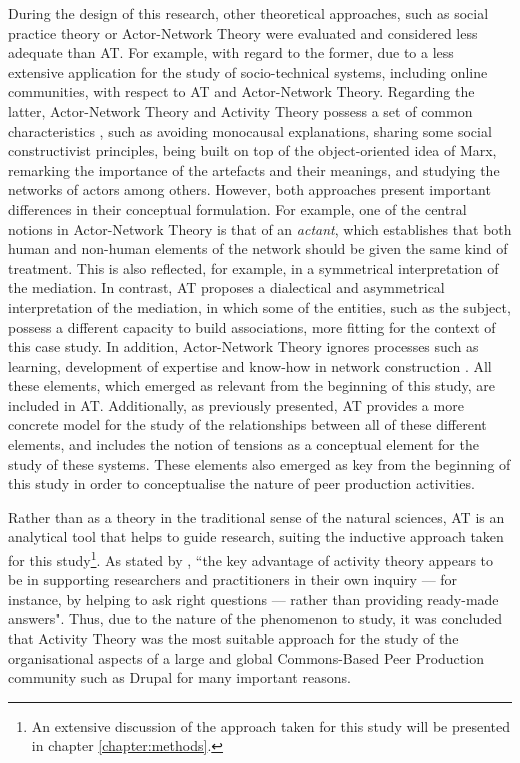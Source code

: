 During the design of this research, other theoretical approaches, such as social practice theory \parencite{shove2012dynamics} or Actor-Network Theory \parencite{latour1987science, callon1986some} were evaluated and considered less adequate than AT. For example, with regard to the former, due to a less extensive application for the study of socio-technical systems, including online communities, with respect to AT and Actor-Network Theory. Regarding the latter, Actor-Network Theory and Activity Theory possess a set of common characteristics \parencite{miettinen1999riddle}, such as avoiding monocausal explanations, sharing some social constructivist principles, being built on top of the object-oriented idea of Marx, remarking the importance of the artefacts and their meanings, and studying the networks of actors among others. However, both approaches present important differences in their conceptual formulation. For example, one of the central notions in Actor-Network Theory is that of an \textit{actant}, which establishes that both human and non-human elements of the network should be given the same kind of treatment. This is also reflected, for example, in a symmetrical interpretation of the mediation. In contrast, AT proposes a dialectical and asymmetrical interpretation of the mediation, in which some of the entities, such as the subject, possess a different capacity to build associations, more fitting for the context of this case study. In addition, Actor-Network Theory ignores processes such as learning, development of expertise and know-how in network construction \parencite{miettinen1999riddle}. All these elements, which emerged as relevant from the beginning of this study, are included in AT. Additionally, as previously presented, AT provides a more concrete model for the study of the relationships between all of these different elements, and includes the notion of tensions as a conceptual element for the study of these systems. These elements also emerged as key from the beginning of this study in order to conceptualise the nature of peer production activities.

Rather than as a theory in the traditional sense of the natural sciences, AT is an analytical tool that helps to guide research, suiting the inductive approach taken for this study\footnote{An extensive discussion of the approach taken for this study will be presented in chapter \ref{chapter:methods}.}. As stated by  \textcite{kaptelinin2012}, ``the key advantage of activity theory appears to be in supporting researchers and practitioners in their own inquiry --- for instance, by helping to ask right questions --- rather than providing ready-made answers". Thus, due to the nature of the phenomenon to study, it was concluded that Activity Theory was the most suitable approach for the study of the organisational aspects of a large and global Commons-Based Peer Production community such as Drupal for many important reasons.

